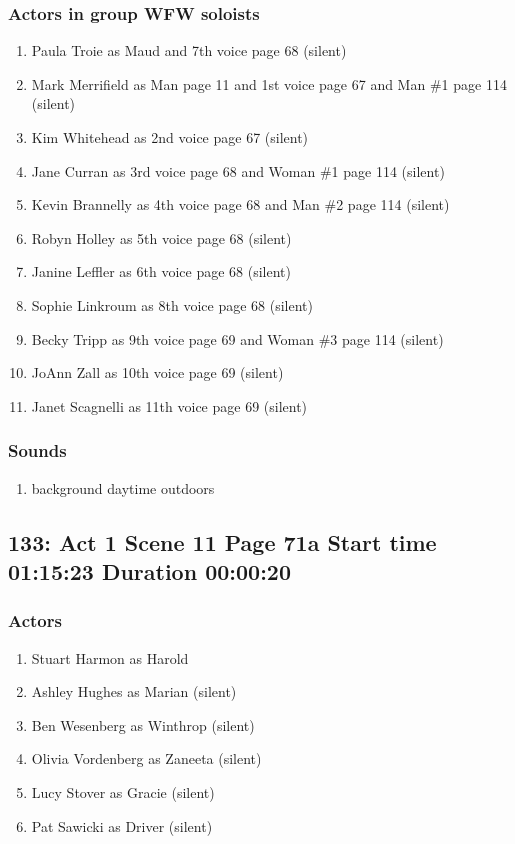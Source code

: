 \subsubsection{Actors in group WFW soloists}
\begin{enumerate}
\item Paula Troie as Maud and 7th voice page 68 (silent)
\item Mark Merrifield as Man page 11 and 1st voice page 67 and Man \#1 page 114 (silent)
\item Kim Whitehead as 2nd voice page 67 (silent)
\item Jane Curran as 3rd voice page 68 and Woman \#1 page 114 (silent)
\item Kevin Brannelly as 4th voice page 68 and Man \#2 page 114 (silent)
\item Robyn Holley as 5th voice page 68 (silent)
\item Janine Leffler as 6th voice page 68 (silent)
\item Sophie Linkroum as 8th voice page 68 (silent)
\item Becky Tripp as 9th voice page 69 and Woman \#3 page 114 (silent)
\item JoAnn Zall as 10th voice page 69 (silent)
\item Janet Scagnelli as 11th voice page 69 (silent)
\end{enumerate}

\subsubsection{Sounds}
\begin{enumerate}
\item background daytime outdoors
\end{enumerate}
\subsection{133: Act 1 Scene 11 Page 71a Start time 01:15:23 Duration 00:00:20}

\subsubsection{Actors}
\begin{enumerate}
\item Stuart Harmon as Harold
\item Ashley Hughes as Marian (silent)
\item Ben Wesenberg as Winthrop (silent)
\item Olivia Vordenberg as Zaneeta (silent)
\item Lucy Stover as Gracie (silent)
\item Pat Sawicki as Driver (silent)
\end{enumerate}
